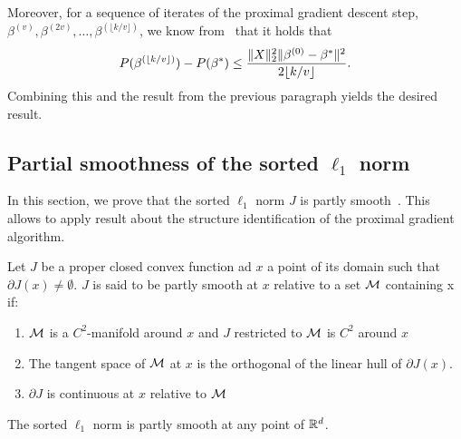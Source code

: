 Moreover, for a sequence of iterates of the proximal gradient descent step,
\(\beta^{(v)}, \beta^{(2v)}, \dots, \beta^{(\lfloor k / v \rfloor)}\),
we know from~\textcite[Theorem 3.1]{beck2009} that it holds that
\[
  P(\beta^{(\lfloor k / v \rfloor)}) - P(\beta^*)
  \leq \frac{\lVert {X} \rVert_2^2 \lVert {\beta^{(0)} - \beta^*} \rVert^2}{2\lfloor k / v \rfloor}.
\]
Combining this and the result from the previous paragraph yields the desired
result.



\subsection{Partial smoothness of the sorted $\ell_1$ norm}
\label{app:sec:partly_smooth}
In this section, we prove that the sorted $\ell_1$ norm $J$ is partly smooth~\parencite{lewis2003active}.
This allows to apply result about the structure identification of the proximal gradient algorithm.

\begin{definition}
  Let $J$ be a proper closed convex function ad $x$ a point of its domain such that $\partial J(x) \neq \emptyset$.
  $J$ is said to be partly smooth at $x$ relative to a set $\mathcal{M}$ containing x if:
  \begin{enumerate}
    \item $\mathcal{M}$ is a $C^2$-manifold around $x$ and $J$ restricted to $\mathcal{M}$ is $C^2$ around $x$
    \item The tangent space of $\mathcal{M}$ at $x$ is the orthogonal of the linear hull of $\partial J(x)$.
    \item $\partial J$ is continuous at $x$ relative to $\mathcal{M}$
  \end{enumerate}
\end{definition}

\begin{proposition}
  The sorted $\ell_1$ norm is partly smooth at any point of $\mathbb{R}^d$.
\end{proposition}


